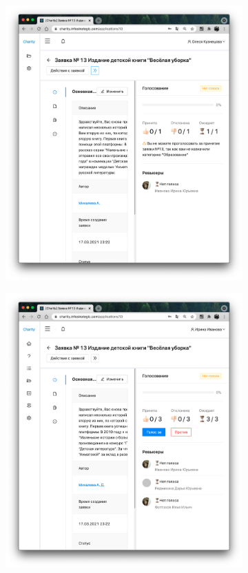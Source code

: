 \documentclass[a4paper,12pt,reqno]{article}
\begin{document}
\begin{figure}[H]
	    \centering
		\begin{subfigure}[b]{0.475\linewidth}
			\includegraphics[width=\linewidth]{img/ro/application_m_vote.png}
		\end{subfigure}
		\begin{subfigure}[b]{0.475\linewidth}
			\includegraphics[width=\linewidth]{img/ro/not_voted.png}

\end{subfigure}
\end{figure}
\end{document}
